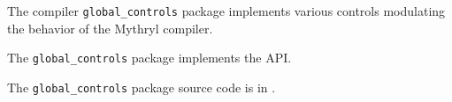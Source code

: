 
The compiler {\tt global\_controls} package implements various controls 
modulating the behavior of the Mythryl compiler.

The {\tt global\_controls} package implements the  API.

The {\tt global\_controls} package source code is in .



